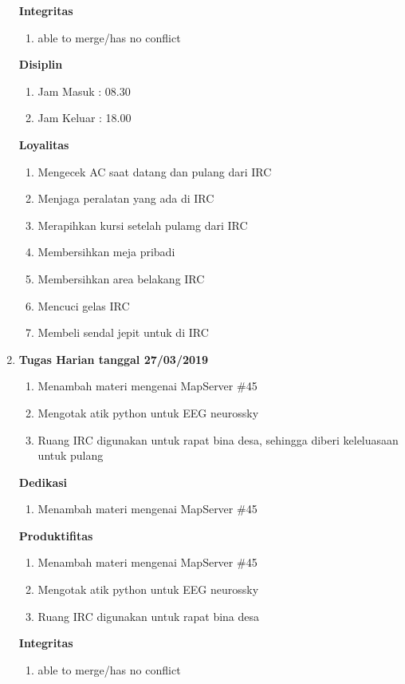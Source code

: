 \begin{enumerate}
\textbf{Integritas}
\begin{enumerate}
\item able to merge/has no conflict
\end{enumerate}

\textbf{Disiplin}
\begin{enumerate}
\item Jam Masuk : 08.30
\item Jam Keluar : 18.00
\end{enumerate}

\textbf{Loyalitas}
\begin{enumerate}
\item Mengecek AC saat datang dan pulang dari IRC
\item Menjaga peralatan yang ada di IRC
\item Merapihkan kursi setelah pulamg dari IRC
\item Membersihkan meja pribadi
\item Membersihkan area belakang IRC
\item Mencuci gelas IRC
\item Membeli sendal jepit untuk di IRC
\end{enumerate}

\item \textbf{Tugas Harian tanggal 27/03/2019}
\begin{enumerate}
\item Menambah materi mengenai MapServer \#45
\item Mengotak atik python untuk EEG neurossky
\item Ruang IRC digunakan untuk rapat bina desa, sehingga diberi keleluasaan untuk pulang
\end{enumerate}

\textbf{Dedikasi}
\begin{enumerate}
\item Menambah materi mengenai MapServer \#45
\end{enumerate}

\textbf{Produktifitas}
\begin{enumerate}
\item Menambah materi mengenai MapServer \#45
\item Mengotak atik python untuk EEG neurossky
\item Ruang IRC digunakan untuk rapat bina desa
\end{enumerate}

\textbf{Integritas}
\begin{enumerate}
\item able to merge/has no conflict
\end{enumerate}


\end{enumerate}
